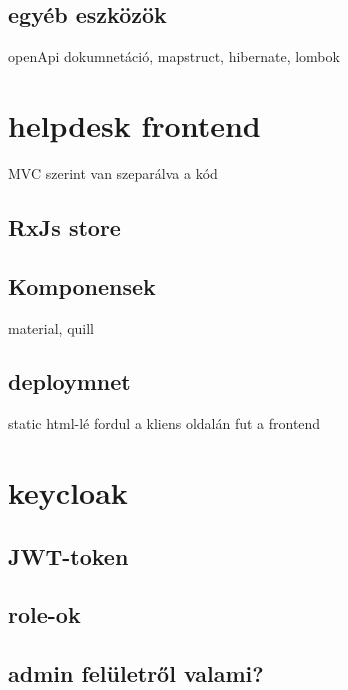 \subsection{egyéb eszközök}
openApi dokumnetáció, mapstruct, hibernate, lombok






\section{helpdesk frontend}
MVC szerint van szeparálva a kód 	

\subsection{RxJs store}

\subsection{Komponensek}
material, quill

\subsection{deploymnet}
static html-lé fordul a kliens oldalán fut a frontend






\section{keycloak}	
\subsection{JWT-token}
\subsection{role-ok}
\subsection{admin felületről valami?}